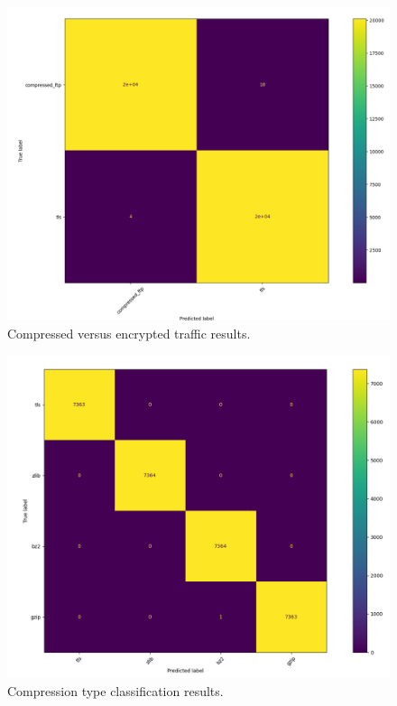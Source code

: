 \begin{figure} [ht!]
\centering
\includegraphics[scale=0.4]{chapters/7/img/compressed_tls.png}
\caption{Compressed versus encrypted traffic results.}
\label{fig:tlscomp}
\end{figure}

\begin{figure} [ht!]
\centering
\includegraphics[scale=0.4]{chapters/7/img/encrypted_compressed.png}
\caption{Compression type classification results.}
\label{fig:comptype}
\end{figure}


